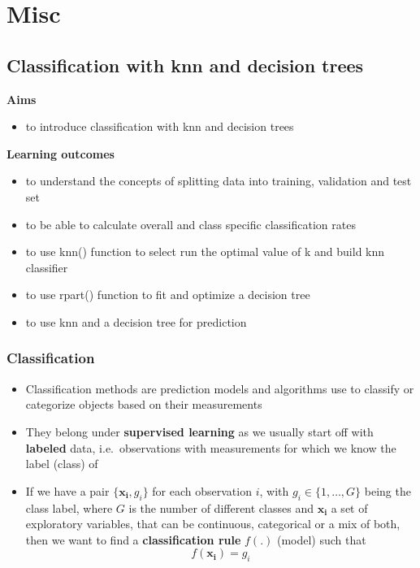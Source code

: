 \documentclass[
]{book}
\providecommand{\tightlist}{%
  \setlength{\itemsep}{0pt}\setlength{\parskip}{0pt}}
\theoremstyle{definition}
\theoremstyle{definition}
\theoremstyle{definition}
\theoremstyle{remark}
\begin{document}
\hypertarget{part-misc}{%
\part{Misc}\label{part-misc}}

\hypertarget{classification-with-knn-and-decision-trees}{%
\chapter{Classification with knn and decision trees}\label{classification-with-knn-and-decision-trees}}

\textbf{Aims}

\begin{itemize}
\tightlist
\item
  to introduce classification with knn and decision trees
\end{itemize}

\textbf{Learning outcomes}

\begin{itemize}
\tightlist
\item
  to understand the concepts of splitting data into training, validation and test set
\item
  to be able to calculate overall and class specific classification rates
\item
  to use knn() function to select run the optimal value of k and build knn classifier
\item
  to use rpart() function to fit and optimize a decision tree
\item
  to use knn and a decision tree for prediction
\end{itemize}

\hypertarget{classification}{%
\section{Classification}\label{classification}}

\begin{itemize}
\tightlist
\item
  Classification methods are prediction models and algorithms use to classify or categorize objects based on their measurements
\item
  They belong under \textbf{supervised learning} as we usually start off with \textbf{labeled} data, i.e.~observations with measurements for which we know the label (class) of
\item
  If we have a pair \(\{\mathbf{x_i}, g_i\}\) for each observation \(i\), with \(g_i \in \{1, \dots, G\}\) being the class label, where \(G\) is the number of different classes and \(\mathbf{x_i}\) a set of exploratory variables, that can be continuous, categorical or a mix of both, then we want to find a \textbf{classification rule} \(f(.)\) (model) such that \[f(\mathbf{x_i})=g_i\]
\end{itemize}
\end{document}
